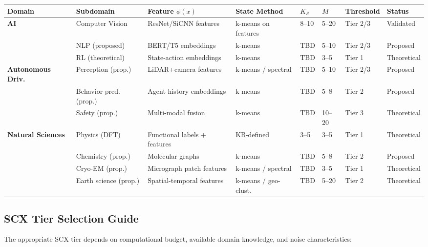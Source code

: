\documentclass{article}
\begin{document}
\begin{table}[ht]
\centering
\small
\begin{tabular}{llllllll}
\toprule
\textbf{Domain} & \textbf{Subdomain} & \textbf{Feature $\phi(x)$} & \textbf{State Method} & $K_{\mathcal{S}}$ & $M$ & \textbf{Threshold} & \textbf{Status} \\
\midrule
\textbf{AI} & Computer Vision & ResNet/SiCNN features & k-means on features & 8--10 & 5--20 & Tier 2/3 & Validated \\
 & NLP (proposed) & BERT/T5 embeddings & k-means & TBD & 5--10 & Tier 2/3 & Proposed \\
 & RL (theoretical) & State-action embeddings & k-means & TBD & 3--5 & Tier 1 & Theoretical \\
\midrule
\textbf{Autonomous Driv.} & Perception (prop.) & LiDAR+camera features & k-means / spectral & TBD & 5--10 & Tier 2/3 & Proposed \\
 & Behavior pred. (prop.) & Agent-history embeddings & k-means & TBD & 5--8 & Tier 2 & Proposed \\
 & Safety (prop.) & Multi-modal fusion & k-means & TBD & 10--20 & Tier 3 & Theoretical \\
\midrule
\textbf{Natural Sciences} & Physics (DFT) & Functional labels + features & KB-defined & 3--5 & 3--5 & Tier 1 & Theoretical \\
 & Chemistry (prop.) & Molecular graphs & k-means & TBD & 5--8 & Tier 2 & Proposed \\
 & Cryo-EM (prop.) & Micrograph patch features & k-means / spectral & TBD & 3--5 & Tier 1 & Theoretical \\
 & Earth science (prop.) & Spatial-temporal features & k-means / geo-clust. & TBD & 5--20 & Tier 2 & Theoretical \\
\bottomrule
\end{tabular}
\vspace{0.2cm}
\end{table}

\subsection{SCX Tier Selection Guide}
\label{sec:tier-guide}

The appropriate SCX tier depends on computational budget, available domain knowledge, and noise characteristics:
\end{document}
